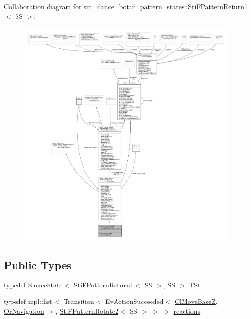Collaboration diagram for sm\+\_\+dance\+\_\+bot\+:\+:f\+\_\+pattern\+\_\+states\+:\+:Sti\+F\+Pattern\+Return1$<$ SS $>$\+:
\nopagebreak
\begin{figure}[H]
\begin{center}
\leavevmode
\includegraphics[width=350pt]{structsm__dance__bot_1_1f__pattern__states_1_1StiFPatternReturn1__coll__graph}
\end{center}
\end{figure}
\subsection*{Public Types}
\begin{DoxyCompactItemize}
\item 
typedef \hyperlink{classSmaccState}{Smacc\+State}$<$ \hyperlink{structsm__dance__bot_1_1f__pattern__states_1_1StiFPatternReturn1}{Sti\+F\+Pattern\+Return1}$<$ SS $>$, SS $>$ \hyperlink{structsm__dance__bot_1_1f__pattern__states_1_1StiFPatternReturn1_afd0d5d7e8dc6ad87f7314176d86d919e}{T\+Sti}
\item 
typedef mpl\+::list$<$ Transition$<$ Ev\+Action\+Succeeded$<$ \hyperlink{classmove__base__z__client_1_1ClMoveBaseZ}{Cl\+Move\+BaseZ}, \hyperlink{classsm__dance__bot_1_1OrNavigation}{Or\+Navigation} $>$, \hyperlink{structsm__dance__bot_1_1f__pattern__states_1_1StiFPatternRotate2}{Sti\+F\+Pattern\+Rotate2}$<$ SS $>$ $>$ $>$ \hyperlink{structsm__dance__bot_1_1f__pattern__states_1_1StiFPatternReturn1_a2fcaf186ce44b90735584e304831f944}{reactions}
\end{DoxyCompactItemize}
